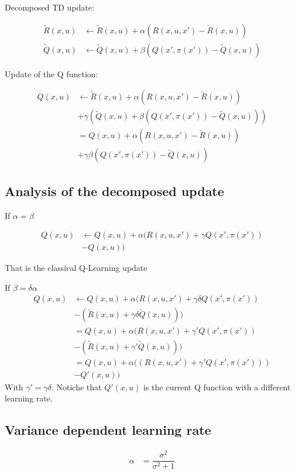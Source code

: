 \documentclass[conference]{IEEEtran}
\begin{document}
Decomposed TD update:

\begin{align}
\tilde{R}(x,u) & \leftarrow\tilde{R}(x,u)+\alpha(R(x,u,x')-\tilde{R}(x,u))\\
\tilde{Q}(x,u) & \leftarrow\tilde{Q}(x,u)+\beta(Q(x',\pi(x'))-\tilde{Q}(x,u))
\end{align}

Update of the Q function:

\begin{align}
Q(x,u) & \leftarrow\tilde{R}(x,u)+\alpha(R(x,u,x')-\tilde{R}(x,u)) \nonumber\\
 & +\gamma\left(\tilde{Q}(x,u)+\beta(Q(x',\pi(x'))-\tilde{Q}(x,u))\right) \nonumber\\
 & =Q(x,u)+\alpha(R(x,u,x')-\tilde{R}(x,u)) \nonumber\\
 & +\gamma\beta(Q(x',\pi(x'))-\tilde{Q}(x,u))
\end{align}

\subsection{Analysis of the decomposed update}
If $\alpha=\beta$

\begin{align}
Q(x,u) & \leftarrow Q(x,u)+\alpha(R(x,u,x')+\gamma Q(x',\pi(x')) \nonumber\\
 & -Q(x,u))
\end{align}

That is the classical Q-Learning update

If $\beta=\delta\alpha$
\begin{align}
Q(x,u) & \leftarrow Q(x,u)+\alpha(R(x,u,x')+\gamma\delta Q(x',\pi(x')) \nonumber\\
 & -(\tilde{R}(x,u)+\gamma\delta\tilde{Q}(x,u))) \nonumber\\
 & =Q(x,u)+\alpha(R(x,u,x')+\gamma'Q(x',\pi(x')) \nonumber\\
 & -(\tilde{R}(x,u)+\gamma'\tilde{Q}(x,u))) \nonumber\\
 & =Q(x,u)+\alpha((R(x,u,x')+\gamma'Q(x',\pi(x'))) \nonumber\\
 & -Q'(x,u))
\end{align}
With $\gamma'=\gamma\delta$. Notiche that $Q'(x,u)$ is the current Q function with a different learning rate.

\subsection{Variance dependent learning rate}
\begin{align}
 \alpha & =\dfrac{\sigma^{2}}{\sigma^{2}+1}
\end{align}
\end{document}
